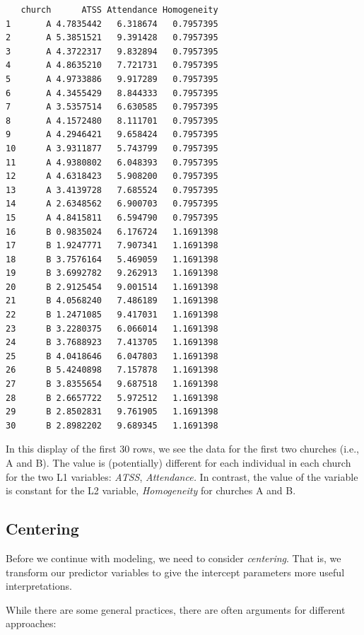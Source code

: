 \documentclass[
  english,
]{book}
\begin{document}
\begin{verbatim}
   church      ATSS Attendance Homogeneity
1       A 4.7835442   6.318674   0.7957395
2       A 5.3851521   9.391428   0.7957395
3       A 4.3722317   9.832894   0.7957395
4       A 4.8635210   7.721731   0.7957395
5       A 4.9733886   9.917289   0.7957395
6       A 4.3455429   8.844333   0.7957395
7       A 3.5357514   6.630585   0.7957395
8       A 4.1572480   8.111701   0.7957395
9       A 4.2946421   9.658424   0.7957395
10      A 3.9311877   5.743799   0.7957395
11      A 4.9380802   6.048393   0.7957395
12      A 4.6318423   5.908200   0.7957395
13      A 3.4139728   7.685524   0.7957395
14      A 2.6348562   6.900703   0.7957395
15      A 4.8415811   6.594790   0.7957395
16      B 0.9835024   6.176724   1.1691398
17      B 1.9247771   7.907341   1.1691398
18      B 3.7576164   5.469059   1.1691398
19      B 3.6992782   9.262913   1.1691398
20      B 2.9125454   9.001514   1.1691398
21      B 4.0568240   7.486189   1.1691398
22      B 1.2471085   9.417031   1.1691398
23      B 3.2280375   6.066014   1.1691398
24      B 3.7688923   7.413705   1.1691398
25      B 4.0418646   6.047803   1.1691398
26      B 5.4240898   7.157878   1.1691398
27      B 3.8355654   9.687518   1.1691398
28      B 2.6657722   5.972512   1.1691398
29      B 2.8502831   9.761905   1.1691398
30      B 2.8982202   9.689345   1.1691398
\end{verbatim}

In this display of the first 30 rows, we see the data for the first two churches (i.e., A and B). The value is (potentially) different for each individual in each church for the two L1 variables: \emph{ATSS}, \emph{Attendance.} In contrast, the value of the variable is constant for the L2 variable, \emph{Homogeneity} for churches A and B.

\hypertarget{centering}{%
\subsection{Centering}\label{centering}}

Before we continue with modeling, we need to consider \emph{centering}. That is, we transform our predictor variables to give the intercept parameters more useful interpretations.

While there are some general practices, there are often arguments for different approaches:
\end{document}
